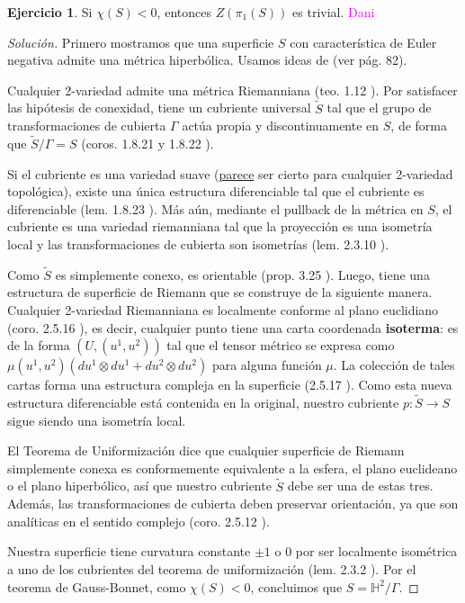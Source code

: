 \documentclass[spanish]{article}
\title{}
\author{Ejercicio}
\date{}
\theoremstyle{definition}
\newtheorem*{ejer*}{Ejercicio}
\newcommand{\Hy}{\mathbb{H}}
\begin{document}
	\begin{ejer*}Si $\chi(S)<0$, entonces $Z(\pi_1(S))$ es trivial. \textcolor{magenta}{Dani}
		\begin{proof}[Solución]
			Primero mostramos que una superficie $S$ con característica de Euler negativa admite una métrica hiperbólica. Usamos ideas de \cite{Wolf} (ver pág. 82).
			
			Cualquier 2-variedad admite una métrica Riemanniana (teo. 1.12 \cite{Loring-dif}). Por satisfacer las hipótesis de conexidad, tiene un cubriente universal $\tilde{S}$ tal que el grupo de transformaciones de cubierta $\Gamma$ actúa propia y discontinuamente en $S$, de forma que $\tilde{S}/\Gamma=S$ (coros. 1.8.21 y 1.8.22 \cite{Wolf}).
			
			Si el cubriente es una variedad suave (\href{https://math.stackexchange.com/questions/322845/can-someone-give-an-example-of-a-non-differentiable-manifold}{parece} ser cierto para cualquier 2-variedad topológica), existe una única estructura diferenciable tal que el cubriente es diferenciable (lem. 1.8.23 \cite{Wolf}). Más aún, mediante el pullback de la métrica en $S$, el cubriente es una variedad riemanniana tal que la proyección es una isometría local y las transformaciones de cubierta son isometrías (lem. 2.3.10 \cite{Wolf}).
			
			Como $\tilde{S}$ es simplemente conexo, es orientable (prop. 3.25 \cite{Hatcher}). Luego, tiene una estructura de superficie de Riemann que se construye de la siguiente manera. Cualquier 2-variedad Riemanniana es localmente conforme al plano euclidiano (coro. 2.5.16 \cite{Wolf}), es decir, cualquier punto tiene una carta coordenada \textbf{isoterma}: es de la forma $(U,(u^1,u^2))$ tal que el tensor métrico se expresa como $\mu(u^1,u^2)(du^1\otimes du^1+du^2\otimes du^2)$ para alguna función $\mu$. La colección de tales cartas forma una estructura compleja en la superficie (2.5.17 \cite{Wolf}). Como esta nueva estructura diferenciable está contenida en la original, nuestro cubriente $p:\tilde{S}\to S$ sigue siendo una isometría local.
			
			El Teorema de Uniformización dice que cualquier superficie de Riemann simplemente conexa es conformemente equivalente a la esfera, el plano euclideano o el plano hiperbólico, así que nuestro cubriente $\tilde{S}$ debe ser una de estas tres. Además, las transformaciones de cubierta deben preservar orientación, ya que son analíticas en el sentido complejo (coro. 2.5.12 \cite{Wolf}).
			
			Nuestra superficie tiene curvatura constante $\pm1$ o $0$ por ser localmente isométrica a uno de los cubrientes del teorema de uniformización (lem. 2.3.2 \cite{Wolf}). Por el teorema de Gauss-Bonnet, como $\chi(S)<0$, concluimos que $S=\Hy^2/\Gamma$.
			

\end{proof}
\end{ejer*}
\end{document}
